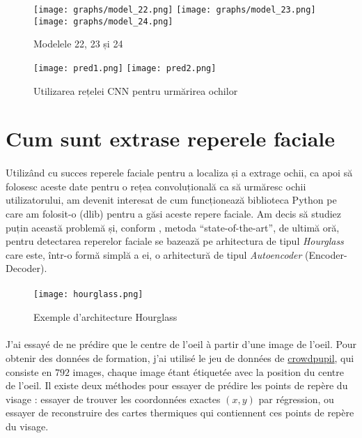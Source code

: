 \begin{figure}
    \centering
    \texttt{[image: graphs/model\_22.png]}
    \texttt{[image: graphs/model\_23.png]}
    \texttt{[image: graphs/model\_24.png]}
    \caption{Modelele 22, 23 și 24}
\end{figure}

\begin{figure}[h]
    \centering
    \texttt{[image: pred1.png]}
    \texttt{[image: pred2.png]}
    \caption{Utilizarea rețelei CNN pentru urmărirea ochilor}
\end{figure}

\section{Cum sunt extrase reperele faciale}
\paragraph{}
Utilizând cu succes reperele faciale pentru a localiza și a extrage ochii, ca apoi să folosesc aceste date pentru o rețea convoluțională ca să urmăresc ochii utilizatorului, am devenit interesat de cum funcționează biblioteca Python pe care am folosit-o (dlib) pentru a găsi aceste repere faciale.
Am decis să studiez puțin această problemă și, conform \cite{paper_stacked_hourglass}, metoda ``state-of-the-art'', de ultimă oră, pentru detectarea reperelor faciale se bazează pe arhitectura de tipul \emph{Hourglass} care este, într-o formă simplă a ei, o arhitectură de tipul \emph{Autoencoder} (Encoder-Decoder).

\paragraph{}


\begin{figure}[h]
    \centering
    \texttt{[image: hourglass.png]}
    \caption{Exemple d'architecture Hourglass}
\end{figure}

\paragraph{}
J'ai essayé de ne prédire que le centre de l'oeil à partir d'une image de l'oeil.
Pour obtenir des données de formation, j'ai utilisé le jeu de données de \href{http://cs.uef.fi/pupoint/}{crowdpupil}, qui consiste en $792$ images, chaque image étant étiquetée avec la position du centre de l'oeil.
Il existe deux méthodes pour essayer de prédire les points de repère du visage : essayer de trouver les coordonnées exactes $(x, y)$ par régression, ou essayer de reconstruire des cartes thermiques qui contiennent ces points de repère du visage.

